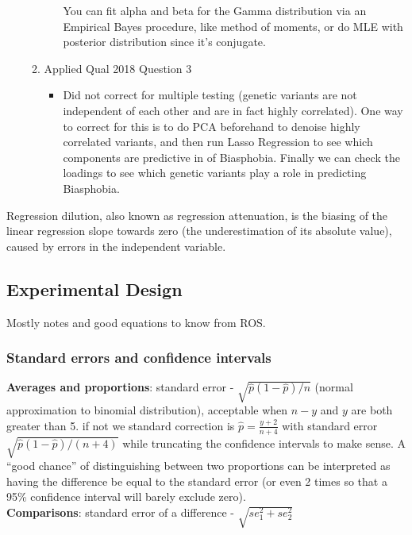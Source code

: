 \documentclass{article}
\begin{document}
\begin{itemize}
\begin{enumerate}[label=(\alph*)]
\begin{itemize}
          You can fit alpha and beta for the Gamma distribution via an Empirical Bayes procedure, like method of moments, or do MLE with posterior distribution since it's conjugate.
      \end{itemize}
    \item Applied Qual 2018 Question 3
      \begin{itemize}
        \item Did not correct for multiple testing (genetic variants are not independent of each other and are in fact highly correlated). One way
          to correct for this is to do PCA beforehand to denoise highly correlated variants, and then run Lasso Regression to see which components are predictive in
          of Biasphobia. Finally we can check the loadings to see which genetic variants play a role in predicting Biasphobia.
      \end{itemize}
  \end{enumerate}

\end{itemize}

Regression dilution, also known as regression attenuation, is the biasing of the linear regression slope towards zero (the underestimation of its absolute value), caused by errors in the independent variable.

\subsection{Experimental Design}
Mostly notes and good equations to know from ROS.

\subsubsection{Standard errors and confidence intervals}
\textbf{Averages and proportions}: standard error - $\sqrt{\hat{p}(1-\hat{p})/n}$ (normal approximation to binomial distribution), acceptable when $n - y$ and $y$ are both greater than 5.
if not we standard correction is $\hat{p} = \frac{y + 2}{n+4}$ with standard error $\sqrt{\hat{p}(1 - \hat{p})/(n+4)}$ while truncating the confidence intervals to make sense.
A ``good chance'' of distinguishing between two proportions can be interpreted as having the difference be equal to the standard error (or even 2 times so that a 95\% confidence interval will barely exclude zero).
\\

\textbf{Comparisons}: standard error of a difference - $\sqrt{se_1^2 + se_2^2}$ \\
\end{document}
